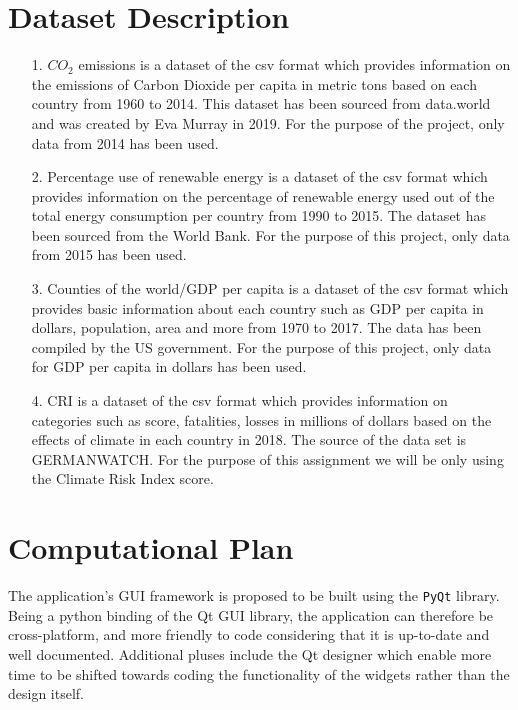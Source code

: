 \documentclass[fontsize=11pt]{article}
\begin{document}
\section*{Dataset Description}

\begin{enumerate}
 \item [1.] $CO_2$ emissions is a dataset of the csv format which provides information on the emissions of Carbon Dioxide per capita in metric tons based on each country from 1960 to 2014.
 This dataset has been sourced from data.world and was created by Eva Murray in 2019.
 For the purpose of the project, only data from 2014 has been used.
 \item[2.] Percentage use of renewable energy is a dataset of the csv format which provides information on the percentage of  renewable energy used out of the total energy consumption per country from 1990 to 2015.
 The dataset has been sourced from the World Bank.
 For the purpose of this project, only data from 2015 has been used.
 \item[3.] Counties of the world/GDP per capita is a dataset of the csv format which provides basic information about each country such as GDP per capita in dollars, population, area and more from 1970 to 2017. The data has been compiled by the US government.
 For the purpose of this project, only data for GDP per capita in dollars has been used.
 \item[4.] CRI is a dataset of the csv format which provides information on categories such as score, fatalities, losses in millions of dollars based on the effects of climate in each country in 2018.
 The source of the data set is GERMANWATCH. For the purpose of this assignment we will be only using the Climate Risk Index score.
\end{enumerate}

\section*{Computational Plan}

The application's GUI framework is proposed to be built using the \texttt{PyQt} library.
Being a python binding of the Qt GUI library, the application can therefore be cross-platform, and more friendly to code
considering that it is up-to-date and well documented.
Additional pluses include the Qt designer which enable more time to be shifted towards coding the functionality of the
widgets rather than the design itself. \newline
\end{document}
